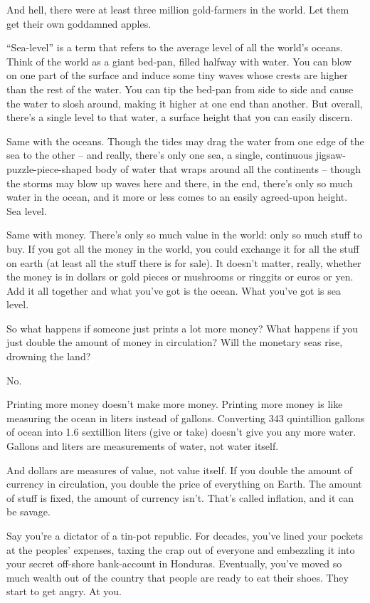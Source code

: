 And hell, there were at least three million gold-farmers in the
world. Let them get their own goddamned apples.

\tb

``Sea-level'' is a term that refers to the average level of all the
world's oceans. Think of the world as a giant bed-pan, filled
halfway with water. You can blow on one part of the surface and
induce some tiny waves whose crests are higher than the rest of the
water. You can tip the bed-pan from side to side and cause the
water to slosh around, making it higher at one end than another.
But overall, there's a single level to that water, a surface height
that you can easily discern.

Same with the oceans. Though the tides may drag the water from one
edge of the sea to the other -- and really, there's only one sea, a
single, continuous jigsaw-puzzle-piece-shaped body of water that
wraps around all the continents -- though the storms may blow up
waves here and there, in the end, there's only so much water in the
ocean, and it more or less comes to an easily agreed-upon height.
Sea level.

Same with money. There's only so much value in the world: only so
much stuff to buy. If you got all the money in the world, you could
exchange it for all the stuff on earth (at least all the stuff
there is for sale). It doesn't matter, really, whether the money is
in dollars or gold pieces or mushrooms or ringgits or euros or yen.
Add it all together and what you've got is the ocean. What you've
got is sea level.

So what happens if someone just prints a lot more money? What
happens if you just double the amount of money in circulation? Will
the monetary seas rise, drowning the land?

No.

Printing more money doesn't make more money. Printing more money is
like measuring the ocean in liters instead of gallons. Converting
343 quintillion gallons of ocean into 1.6 sextillion liters (give
or take) doesn't give you any more water. Gallons and liters are
measurements of water, not water itself.

And dollars are measures of value, not value itself. If you double
the amount of currency in circulation, you double the price of
everything on Earth. The amount of stuff is fixed, the amount of
currency isn't. That's called inflation, and it can be savage.

Say you're a dictator of a tin-pot republic. For decades, you've
lined your pockets at the peoples' expenses, taxing the crap out of
everyone and embezzling it into your secret off-shore bank-account
in Honduras. Eventually, you've moved so much wealth out of the
country that people are ready to eat their shoes. They start to get
angry. At you.

